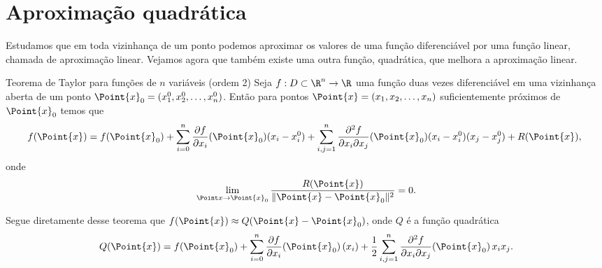 \section{Aproximação quadrática}
Estudamos que em toda vizinhança de um ponto podemos aproximar os valores de uma função diferenciável por uma função linear, chamada de aproximação linear. Vejamos agora que também existe uma outra função, quadrática, que melhora a aproximação linear. 
\begin{theorem}{Teorema de Taylor para funções de $n$ variáveis (ordem 2)}{}
    Seja $f:D\subset\R^n\to\R$ uma função duas vezes diferenciável em uma vizinhança aberta de um ponto $\Point{x}_0=(x_1^0,x_2^0,\dots,x_n^0)$. Então para pontos $\Point{x}=(x_1,x_2,\dots,x_n)$ suficientemente próximos de $\Point{x}_0$ temos que
    $$\!\!f(\Point{x})=f(\Point{x}_0) + \sum_{i=0}^n \dfrac{\partial f}{\partial x_i} (\Point{x}_0) (x_i-x_i^0) + \sum_{i,j=1}^n \dfrac{\partial ^2 f}{\partial x_i \partial x_j}(\Point{x}_0)(x_i-x_i^0)(x_j-x_j^0) + R(\Point{x}),$$
    onde 
    $$\lim_{\Point x \rightarrow \Point{x}_0} \dfrac{R(\Point{x})}{\|\Point{x}-\Point{x}_0\|^2}=0. $$
\end{theorem}
Segue diretamente desse teorema que 
$f(\Point{x})\approx Q(\Point{x}-\Point{x}_0)$, onde $Q$ é a função quadrática
$$Q(\Point{x}) = f(\Point{x}_0) + \sum_{i=0}^n \dfrac{\partial f}{\partial x_i} (\Point{x}_0) \,(x_i) + \frac{1}{2}\sum_{i,j=1}^n \dfrac{\partial ^2 f}{\partial x_i \partial x_j}(\Point{x}_0)\,x_ix_j.$$
